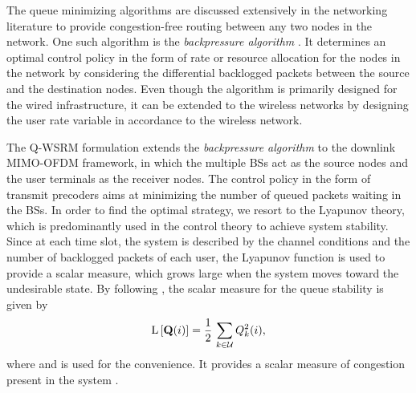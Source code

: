 
The queue minimizing algorithms are discussed extensively in the networking literature to provide congestion-free routing between any two nodes in the network. One such algorithm  is the \emph{backpressure algorithm} \cite{tassiulas,georgiadis2006resource,neely2010stochastic}. It determines an optimal control policy in the form of rate or resource allocation for the nodes in the network by considering the differential backlogged packets between the source and the destination nodes. Even though the algorithm is primarily designed for the wired infrastructure, it can be extended to the wireless networks by designing the user rate variable  in accordance to the wireless network.

The \ac{Q-WSRM} formulation extends the \emph{backpressure algorithm} to the downlink \ac{MIMO}-\ac{OFDM} framework, in which the multiple \acp{BS} act as the source nodes and the user terminals as the receiver nodes. The control policy in the form of transmit precoders aims at minimizing the number of queued packets waiting in the \acp{BS}. In order to find the optimal strategy, we resort to the Lyapunov theory, which is predominantly used in the control theory to achieve system stability. Since at each time slot, the system is described by the channel conditions and the number of backlogged packets of each user, the Lyapunov function is used to provide a scalar measure, which grows large when the system moves toward the undesirable state. By following \cite{neely2010stochastic}, the scalar measure for the queue stability is given by
\begin{equation}
\mathrm{L}\left [ \mathbf{Q}(i) \right ] = \frac{1}{2} \, \sum_{k \in \mathcal{U}} Q_k^2(i),
\end{equation}
where  and  is used for the convenience. It provides a scalar measure of congestion present in the system \cite[Ch. 3]{neely2010stochastic}. 

